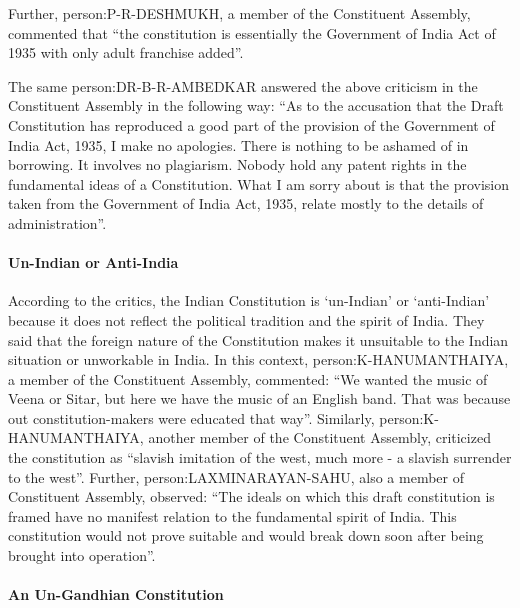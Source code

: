 \begin{multicol}{2}
Further, \gls{person:P-R-DESHMUKH}, a member of the Constituent Assembly, commented that ``the constitution is essentially the Government of India Act of 1935 with only adult franchise added''.

The same \gls{person:DR-B-R-AMBEDKAR} answered the above criticism in the Constituent Assembly in the following way: ``As to the accusation that the Draft Constitution has reproduced a good part of the provision of the Government of India Act, 1935, I make no apologies. There is nothing to be ashamed of in borrowing. It involves no plagiarism. Nobody hold any patent rights in the fundamental ideas of a Constitution. What I am sorry about is that the provision taken from the Government of India Act, 1935, relate mostly to the details of administration''.

\paragraph{Un-Indian or Anti-India}

According to the critics, the Indian Constitution is `un-Indian' or `anti-Indian' because it does not reflect the political tradition and the spirit of India. They said that the foreign nature of the Constitution makes it unsuitable to the Indian situation or unworkable in India. In this context, \gls{person:K-HANUMANTHAIYA}, a member of the Constituent Assembly, commented: ``We wanted the music of Veena or Sitar, but here we have the music of an English band. That was because out constitution-makers were educated that way''. Similarly, \gls{person:K-HANUMANTHAIYA}, another member of the Constituent Assembly, criticized the constitution as ``slavish imitation of the west, much more - a slavish surrender to the west''. Further, \gls{person:LAXMINARAYAN-SAHU}, also a member of Constituent Assembly, observed: ``The ideals on which this draft constitution is framed have no manifest relation to the fundamental spirit of India. This constitution would not prove suitable and would break down soon after being brought into operation''.

\paragraph{An Un-Gandhian Constitution}


\end{multicol}

